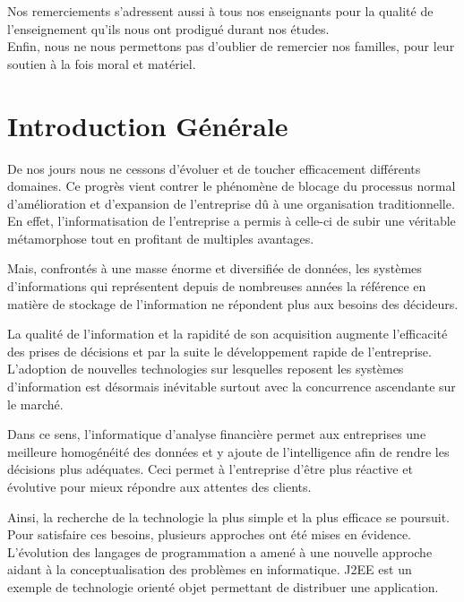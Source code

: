 \documentclass[a4paper,10pt]{article}
\begin{document}
Nos remerciements s'adressent aussi à tous nos enseignants pour la qualité de l'enseignement qu'ils nous ont prodigué durant nos études.\\

Enfin, nous ne nous permettons pas d'oublier de remercier nos familles, pour leur soutien à la fois moral et matériel.\\
\newpage
\tableofcontents
\newpage

\section{Introduction Générale}

\normalsize
De nos jours nous ne cessons d’évoluer et de toucher efficacement différents domaines. Ce progrès vient contrer le phénomène de blocage du processus normal d'amélioration et d'expansion de l'entreprise dû à une organisation traditionnelle. En effet, l'informatisation de l'entreprise a permis à celle-ci de subir une véritable métamorphose tout en profitant de multiples avantages.\\
\par
Mais, confrontés à une masse énorme et diversifiée de données, les systèmes d'informations qui représentent depuis de nombreuses années la référence en matière de stockage de l'information ne répondent plus aux besoins des décideurs.\\
\par 
La qualité de l'information et la rapidité de son acquisition augmente l'efficacité des prises de décisions et par la suite le développement rapide de l'entreprise. L'adoption  de nouvelles technologies sur lesquelles reposent les systèmes d'information est désormais inévitable  surtout avec la concurrence ascendante  sur le marché.\\
\par
Dans  ce sens, l'informatique d’analyse financière permet  aux  entreprises  une  meilleure homogénéité des données et y ajoute  de l'intelligence afin de rendre les décisions plus adéquates.  Ceci permet  à l'entreprise  d'être  plus réactive  et évolutive pour mieux répondre aux attentes des clients.\\
\par
Ainsi, la recherche de la technologie la plus simple et la plus efficace se poursuit. Pour satisfaire ces besoins, plusieurs approches ont été mises en évidence. L'évolution des langages de programmation a amené à  une nouvelle approche aidant à  la conceptualisation des problèmes en informatique. J2EE est un exemple de technologie orienté objet permettant de distribuer une application.\\
\end{document}
